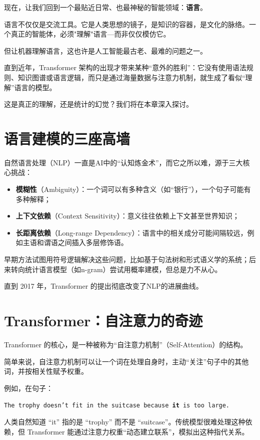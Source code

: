 现在，让我们回到一个最贴近日常、也最神秘的智能领域：\textbf{语言}。

语言不仅仅是交流工具。它是人类思想的镜子，是知识的容器，是文化的脉络。一个真正的智能体，必须"理解"语言---而非仅仅模仿它。

但让机器理解语言，这也许是人工智能最古老、最难的问题之一。

直到近年，Transformer 架构的出现才带来某种“意外的胜利”：它没有使用语法规则、知识图谱或语言逻辑，而只是通过海量数据与注意力机制，就生成了看似“理解”语言的模型。

这是真正的理解，还是统计的幻觉？我们将在本章深入探讨。

\section*{语言建模的三座高墙}

自然语言处理（NLP）一直是AI中的“认知炼金术”，而它之所以难，源于三大核心挑战：

\begin{itemize}
\item \textbf{模糊性}（Ambiguity）：一个词可以有多种含义（如“银行”），一个句子可能有多种解释；
\item \textbf{上下文依赖}（Context Sensitivity）：意义往往依赖上下文甚至世界知识；
\item \textbf{长距离依赖}（Long-range Dependency）：语言中的相关成分可能间隔较远，例如主语和谓语之间插入多层修饰语。
\end{itemize}

早期方法试图用符号逻辑解决这些问题，比如基于句法树和形式语义学的系统；后来转向统计语言模型（如n-gram）尝试用概率建模，但总是力不从心。

直到 2017 年，Transformer 的提出彻底改变了NLP的进展曲线。

\section*{Transformer：自注意力的奇迹}

Transformer 的核心，是一种被称为“自注意力机制”（Self-Attention）的结构。

简单来说，自注意力机制可以让一个词在处理自身时，主动“关注”句子中的其他词，并按相关性赋予权重。

例如，在句子：
\begin{center}
\texttt{The trophy doesn't fit in the suitcase because \textbf{it} is too large.}
\end{center}
人类自然知道 “it” 指的是 “trophy” 而不是 “suitcase”。传统模型很难处理这种依赖，但 Transformer 能通过注意力权重“动态建立联系”，模拟出这种指代关系。

